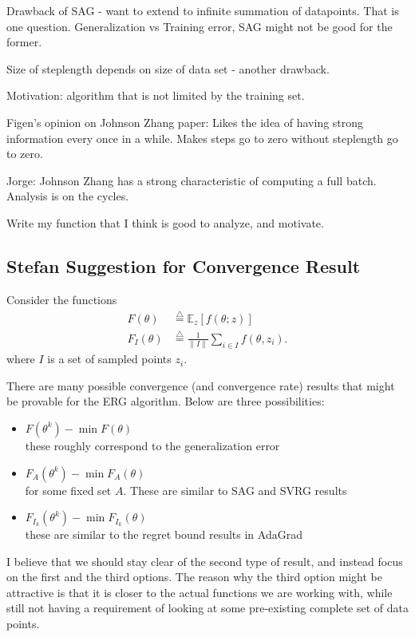 \documentclass[12pt]{article}
\newcommand{\defeq}{\stackrel{\triangle}{=}}
\begin{document}
	Drawback of SAG - want to extend to infinite summation of datapoints. That is one question. Generalization vs Training error, SAG might not be good for the former.
	
	Size of steplength depends on size of data set  - another drawback. 
	
	
	Motivation: algorithm that is not limited by the training set. 
	
	Figen's opinion on Johnson Zhang paper: Likes the idea of having strong information every once in a while. Makes steps go to zero without steplength go to zero. 
	
	Jorge: Johnson Zhang has a strong characteristic of computing a full batch. Analysis is on the cycles. 
	
	Write my function that I think is good to analyze, and motivate. 
	
	\subsection{Stefan Suggestion for Convergence Result}

	Consider the functions
	\begin{align*}
		F(\theta) & \defeq \mathbb{E}_{z}[ f(\theta;z)] \\
		F_I(\theta) & \defeq \frac{1}{\|I\|} \sum_{i \in I}  f(\theta, z_i).
	\end{align*}
	where $I$ is a set of sampled points $z_i$.
	
	
	There are many possible convergence (and convergence rate) results that might be provable for the ERG algorithm. Below are three possibilities:
	
	\begin{itemize}
		\item $F(\theta^k) - \min F(\theta) $ \\ these roughly correspond to the generalization error \\
		\item $F_{A}(\theta^k)- \min F_{A}(\theta) $ \\for some fixed set $A$. These are similar to SAG and SVRG results \\
		\item $F_{I_k}(\theta^k) - \min F_{I_k}(\theta)  $ \\ these are similar to the regret bound results in AdaGrad \\
	\end{itemize}
	
	I believe that we should stay clear of the second type of result, and instead focus on the first and the third options. The reason why the third option might be attractive is that it is closer to the actual functions we are working with, while still not having a requirement of looking at some pre-existing complete set of data points. 
	
\end{document}
